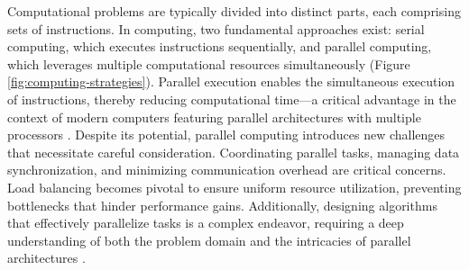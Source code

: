 \documentclass[Ingles]{phdthesis}
\begin{document}
Computational problems are typically divided into distinct parts, each comprising sets of instructions. In computing, two fundamental approaches exist: serial computing, which executes instructions sequentially, and parallel computing, which leverages multiple computational resources simultaneously (Figure \ref{fig:computing-strategies}). Parallel execution enables the simultaneous execution of instructions, thereby reducing computational time---a critical advantage in the context of modern computers featuring parallel architectures with multiple processors \cite{foster1995,grama2003}. Despite its potential, parallel computing introduces new challenges that necessitate careful consideration. Coordinating parallel tasks, managing data synchronization, and minimizing communication overhead are critical concerns. Load balancing becomes pivotal to ensure uniform resource utilization, preventing bottlenecks that hinder performance gains. Additionally, designing algorithms that effectively parallelize tasks is a complex endeavor, requiring a deep understanding of both the problem domain and the intricacies of parallel architectures \cite{grama2003,matloff2012}.
\end{document}
